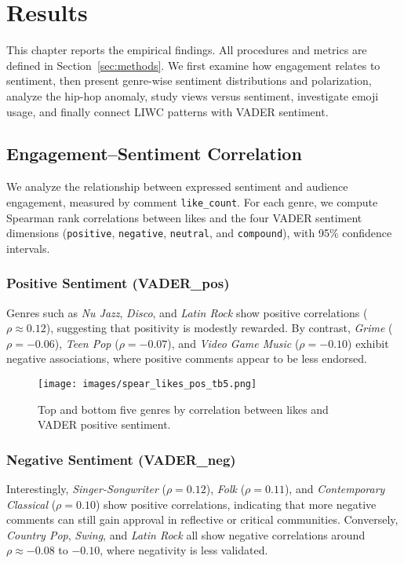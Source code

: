 

\cleardoubleoddpage %
\chapter{Results}
\label{sec:results}

This chapter reports the empirical findings. All procedures and metrics are defined in
Section~\ref{sec:methods}. We first examine how engagement relates to sentiment,
then present genre-wise sentiment distributions and polarization, analyze the hip-hop
anomaly, study views versus sentiment, investigate emoji usage, and finally connect
LIWC patterns with VADER sentiment.


\section{Engagement--Sentiment Correlation}
\label{subsec:results_engagement}

We analyze the relationship between expressed sentiment and audience engagement, measured
by comment \texttt{like\_count}. For each genre, we compute Spearman rank correlations 
between likes and the four VADER sentiment dimensions (\texttt{positive}, \texttt{negative},
\texttt{neutral}, and \texttt{compound}), with 95\% confidence intervals.

\subsection*{Positive Sentiment (VADER\_pos)}
Genres such as \textit{Nu Jazz}, \textit{Disco}, and \textit{Latin Rock} show positive 
correlations ($\rho \approx 0.12$), suggesting that positivity is modestly rewarded. 
By contrast, \textit{Grime} ($\rho = -0.06$), \textit{Teen Pop} ($\rho = -0.07$), and 
\textit{Video Game Music} ($\rho = -0.10$) exhibit negative associations, where positive 
comments appear to be less endorsed.

\begin{figure}[htbp]
    \centering
    \texttt{[image: images/spear\_likes\_pos\_tb5.png]}
    \caption{Top and bottom five genres by correlation between likes and VADER positive sentiment.}
    \label{fig:spear_likes_pos}
\end{figure}
\FloatBarrier

\subsection*{Negative Sentiment (VADER\_neg)}
Interestingly, \textit{Singer-Songwriter} ($\rho = 0.12$), \textit{Folk} ($\rho = 0.11$), 
and \textit{Contemporary Classical} ($\rho = 0.10$) show positive correlations, indicating 
that more negative comments can still gain approval in reflective or critical communities. 
Conversely, \textit{Country Pop}, \textit{Swing}, and \textit{Latin Rock} all show 
negative correlations around $\rho \approx -0.08$ to $-0.10$, where negativity is less validated.


